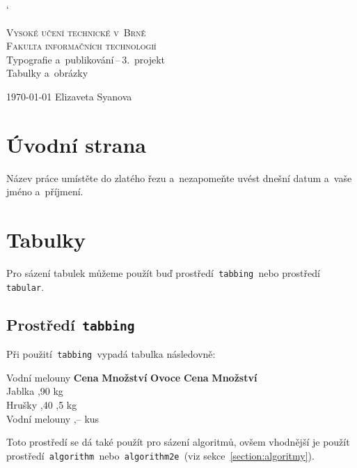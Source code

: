 \documentclass[a4paper, 11pt]{article}
\begin{document}
	\catcode`

	\begin{titlepage}
		\begin{center}
			\Huge
			\textsc{Vysoké učení technické v~Brně} \\
			\huge
			\textsc{Fakulta informačních technologií} \\
			\LARGE
			Typografie a~publikování\,--\,3.~projekt \\
			\Huge
			Tabulky a~obrázky
		\end{center}

		{\Large
			\today
			\hfill
			Elizaveta Syanova
		}
	\end{titlepage}


	\section{Úvodní strana}

	Název práce umístěte do zlatého řezu a~nezapomeňte uvést dnešní datum a~vaše jméno a~příjmení.


	\section{Tabulky}

	Pro sázení tabulek můžeme použít buď prostředí\texttt{ tabbing }nebo prostředí\texttt{ tabular}.


	\subsection{Prostředí\texttt{ tabbing}}

	Při použití\texttt{ tabbing }vypadá tabulka následovně:
	\begin{tabbing}
		Vodní melouny \quad	\= \textbf{Cena} \quad	\= \textbf{Množství}	\kill
		\textbf{Ovoce}		\> \textbf{Cena}		\> \textbf{Množství}	\\
		Jablka				,90				 kg					\\
		Hrušky				,40				,5 kg				\\
		Vodní melouny		,--				 kus				\\
	\end{tabbing}
	Toto prostředí se dá také použít pro sázení algoritmů, ovšem vhodnější je použít
	prostředí\texttt{ algorithm }nebo\texttt{ algorithm2e }(viz sekce~\ref{section:algoritmy}).
\end{document}
